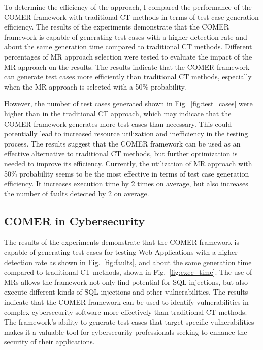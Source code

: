 To determine the efficiency of the approach, I compared the performance of the COMER framework with traditional CT methods in terms of test case generation efficiency. The results of the experiments demonstrate that the COMER framework is capable of generating test cases with a higher detection rate and about the same generation time compared to traditional CT methods. Different percentages of MR approach selection were tested to evaluate the impact of the MR approach on the results. The results indicate that the COMER framework can generate test cases more efficiently than traditional CT methods, especially when the MR approach is selected with a 50\% probability.

However, the number of test cases generated shown in Fig.~\ref{fig:test_cases} were higher than in the traditional CT approach, which may indicate that the COMER framework generates more test cases than necessary. This could potentially lead to increased resource utilization and inefficiency in the testing process. The results suggest that the COMER framework can be used as an effective alternative to traditional CT methods, but further optimization is needed to improve its efficiency. Currently, the utilization of MR approach with 50\% probability seems to be the most effective in terms of test case generation efficiency. It increases execution time by 2 times on average, but also increases the number of faults detected by 2 on average.

\subsection{COMER in Cybersecurity}

The results of the experiments demonstrate that the COMER framework is capable of generating test cases for testing Web Applications with a higher detection rate as shown in Fig.~\ref{fig:faults}, and about the same generation time compared to traditional CT methods, shown in Fig.~\ref{fig:exec_time}. The use of MRs allows the framework not only find potential for SQL injections, but also execute different kinds of SQL injections and other vulnerabilities. The results indicate that the COMER framework can be used to identify vulnerabilities in complex cybersecurity software more effectively than traditional CT methods. The framework's ability to generate test cases that target specific vulnerabilities makes it a valuable tool for cybersecurity professionals seeking to enhance the security of their applications.

